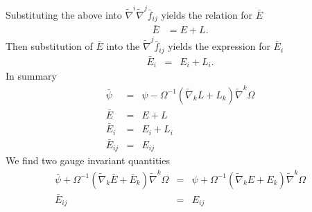 \documentclass[10pt,letterpaper]{article}
\numberwithin{equation}{section}
\begin{document}
Substituting the above into $\tilde\nabla^i\tilde\nabla^j \bar f_{ij}$ yields the relation for $\bar E$
\begin{eqnarray}
\bar E &= E + L.
\end{eqnarray}
Then substitution of $\bar E$ into the $\tilde\nabla^j \bar f_{ij}$ yields the expression for $\bar E_i$
\begin{eqnarray}
\bar E_i &=& E_i + L_i.
\end{eqnarray}
In summary
\begin{eqnarray}
\bar\psi &=& \psi - \Omega^{-1}(\tilde\nabla_k L + L_k)\tilde\nabla^k \Omega
\nonumber\\
\bar E&=& E+L
\nonumber\\
\bar E_i &=& E_i + L_i
\nonumber\\
\bar E_{ij} &=& E_{ij}
\end{eqnarray}
We find two gauge invariant quantities
\begin{eqnarray}
\bar \psi + \Omega^{-1}(\tilde\nabla_k \bar E + \bar E_k)\tilde\nabla^k \Omega
&=& \psi + \Omega^{-1}(\tilde\nabla_k  E +  E_k)\tilde\nabla^k \Omega
\nonumber\\
\bar E_{ij} &=& E_{ij}
\end{eqnarray}
\end{document}
